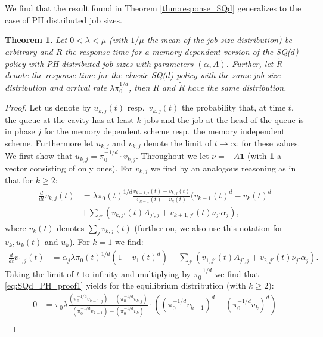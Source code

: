 \documentclass[12pt]{report}
\newtheorem{theorem}{Theorem}
\begin{document}
We find that the result found in Theorem \ref{thm:response_SQd} generalizes to the case of PH distributed job sizes.
\begin{theorem} \label{thm:response_SQd_PHD}
Let $0<\lambda<\mu$ (with $1/\mu$ the mean of the job size distribution) be arbitrary and $R$ the response time for a memory dependent version of the SQ($d$) policy with PH distributed job sizes with parameters $(\alpha, A)$. Further, let $\tilde R$ denote the response time for the
classic SQ($d$) policy with the same job size distribution and arrival rate $\lambda \pi_0^{1/d}$, then $R$ and $\tilde R$ have the same distribution.
\end{theorem}
\begin{proof}
Let us denote by $u_{k,j}(t)$ resp.~$v_{k,j}(t)$ the probability that, at time $t$, the queue at the cavity has at least $k$ jobs and the job at the head of the queue is in phase $j$ for the memory dependent scheme resp.~the memory independent scheme. Furthermore let $u_{k,j}$ and $v_{k,j}$ denote the limit of $t\rightarrow\infty$ for these values. We first show that $u_{k,j}=\pi_0^{-1/d} \cdot v_{k,j}$. Throughout we let $\nu = -A \textbf{1}$ (with \textbf{1} a vector consisting of only ones). For $v_{k,j}$ we find by an analogous reasoning as in \cite{van2015performance} that for $k\geq 2$:
\begin{align}
\frac{d}{dt} v_{k,j}(t)
&= \lambda \pi_0(t)^{1/d} \frac{v_{k-1,j}(t)-v_{k,j}(t)}{v_{k-1}(t)-v_k(t)} (v_{k-1}(t)^d-v_k(t)^d \nonumber\\
&+ \sum_{j'} \left( v_{k,j'}(t) A_{j',j} + v_{k+1,j'}(t) \nu_{j'} \alpha_j\right), \label{eq:SQd_PH_proof1}
\end{align}
where $v_k(t)$ denotes $\sum_j v_{k,j}(t)$ (further on, we also use this notation for $v_k, u_k(t)$ and $u_k$). For $k=1$ we find:
\begin{align}
\frac{d}{dt} v_{1,j}(t) &= \alpha_j \lambda \pi_0(t)^{1/d} (1-v_1(t)^d) + \sum_{j'} \left( v_{1,j'}(t) A_{j',j} + v_{2,j'}(t) \nu_{j'} \alpha_j\right).\label{eq:SQd_PH_proof2}
\end{align}
Taking the limit of $t$ to infinity and multiplying by $\pi_0^{-1/d}$ we find that \eqref{eq:SQd_PH_proof1} yields for the equilibrium distribution (with $k\geq 2$):
\begin{align}
0&= \pi_0 \lambda \frac{(\pi_0^{-1/d} v_{k-1,j})- (\pi_0^{-1/d} v_{k,j})}{(\pi_0^{-1/d} v_{k-1})-(\pi_0^{-1/d} v_{k})} \cdot \left( (\pi_0^{-1/d} v_{k-1})^d - (\pi_0^{-1/d} v_{k})^d \right)\nonumber\\

\end{align}
\end{proof}
\end{document}
